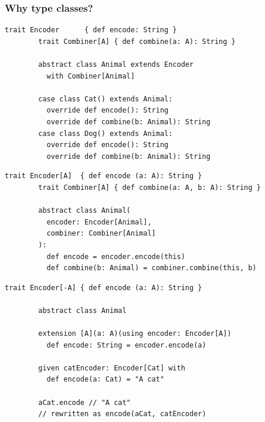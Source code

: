 \begin{frame}[fragile]
  \frametitle{Why type classes?}

  \begin{overprint}
    \begin{example}[Inheritance]
      \begin{lstlisting}[gobble=8]
        trait Encoder      { def encode: String }
        trait Combiner[A] { def combine(a: A): String }
  
        abstract class Animal extends Encoder
          with Combiner[Animal]
  
        case class Cat() extends Animal:
          override def encode(): String
          override def combine(b: Animal): String
        case class Dog() extends Animal:
          override def encode(): String
          override def combine(b: Animal): String
      \end{lstlisting}
    \end{example}


    \begin{example}[Composition]
      \begin{lstlisting}[gobble=8]
        trait Encoder[A]  { def encode (a: A): String }
        trait Combiner[A] { def combine(a: A, b: A): String }
    
        abstract class Animal(
          encoder: Encoder[Animal],
          combiner: Combiner[Animal]
        ):
          def encode = encoder.encode(this)
          def combine(b: Animal) = combiner.combine(this, b)
      \end{lstlisting}
    \end{example}


    \begin{example}
      \begin{lstlisting}[gobble=8]
        trait Encoder[-A] { def encode (a: A): String }
    
        abstract class Animal
    
        extension [A](a: A)(using encoder: Encoder[A])
          def encode: String = encoder.encode(a)
    
        given catEncoder: Encoder[Cat] with
          def encode(a: Cat) = "A cat"
    
        aCat.encode // "A cat"
        // rewritten as encode(aCat, catEncoder)
      \end{lstlisting}
    \end{example}
  \end{overprint}
\end{frame}


